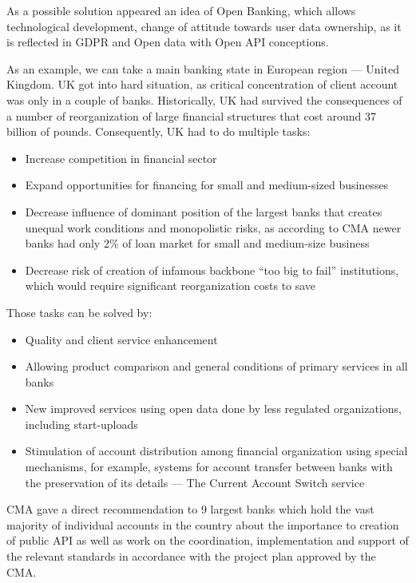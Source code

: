 As a possible solution appeared an idea of Open Banking, which allows technological development, change of attitude towards user data ownership, as it is reflected in GDPR and Open data with Open API conceptions.

As an example, we can take a main banking state in European region — United Kingdom.
UK got into hard situation, as critical concentration of client account was only in a couple of banks.
Historically, UK had survived the consequences of a number of reorganization of large financial structures that cost around 37 billion of pounds.
Consequently, UK had to do multiple tasks:
\begin{itemize}
    \item Increase competition in financial sector
    \item Expand opportunities for financing for small and medium-sized businesses 
    \item Decrease influence of dominant position of the largest banks that creates unequal work conditions and monopolistic risks, as according to CMA newer banks had only 2\% of loan market for small and medium-size business
    \item Decrease risk of creation of infamous backbone “too big to fail” institutions, which would require significant reorganization costs to save
\end{itemize}

Those tasks can be solved by:
\begin{itemize}
    \item Quality and client service enhancement
    \item Allowing product comparison and general conditions of primary services in all banks
    \item New improved services using open data done by less regulated organizations, including start-uploads
    \item Stimulation of account distribution among financial organization using special mechanisms, for example, systems for account transfer between banks with the preservation of its details — The Current Account Switch service
\end{itemize}

CMA gave a direct recommendation to 9 largest banks which hold the vast majority of individual accounts in the country about the importance to creation of public API as well as work on the coordination, implementation and support of the relevant standards in accordance with the project plan approved by the CMA.

